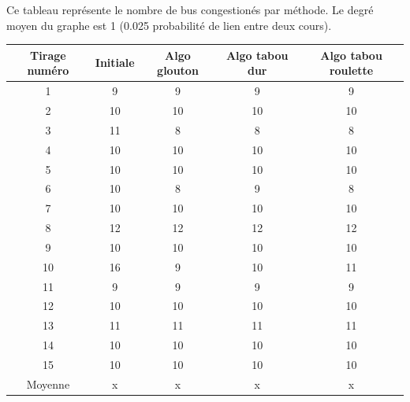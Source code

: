 \documentclass[a4paper,11pt]{article}
\begin{document}
	Ce tableau représente le nombre de bus congestionés par méthode. Le degré moyen du graphe est 1 (0.025 probabilité de lien entre deux cours).\\ 
	\begin{tabular}{|c|c|c|c|c|}
  		\hline
  		Tirage numéro & Initiale & Algo glouton & Algo tabou dur & Algo tabou roulette\\
  		\hline
  		1 & 9 & 9 & 9 & 9\\
  		\hline
  		2 & 10 & 10 & 10 & 10\\
  		\hline
  		3 & 11 & 8 & 8 & 8\\
  		\hline
  		4 & 10 & 10 & 10 & 10\\
  		\hline
  		5 & 10 & 10 & 10 & 10\\
  		\hline
  		6 & 10 & 8 & 9 & 8\\
  		\hline
  		7 & 10 & 10 & 10 & 10\\
  		\hline
  		8 & 12 & 12 & 12 & 12\\
  		\hline
  		9 & 10 & 10 & 10 & 10\\
  		\hline
  		10 & 16 & 9 & 10 & 11\\
  		\hline
  		11 & 9 & 9 & 9 & 9\\
  		\hline
  		12 & 10 & 10 & 10 & 10\\
  		\hline
  		13 & 11 & 11 & 11 & 11\\
  		\hline
  		14 & 10 & 10 & 10 & 10\\
  		\hline
  		15 & 10 & 10 & 10 & 10\\
  		\hline
  		Moyenne & x & x & x & x\\
  		\hline
	\end{tabular}
\end{document}
